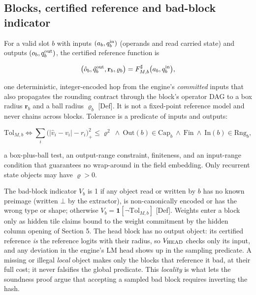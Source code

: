 \documentclass[10pt]{article}
\begin{document}
\subsection{Blocks, certified reference and bad-block indicator}
For a valid slot $b$ with inputs $(a_b,q^{\rm in}_b)$ (operands and read carried state) and outputs $(o_b,q^{\rm out}_b)$, the certified reference function is

\[\big(\hat o_b,\hat q^{\rm out}_b,\mathbf r_b,\varrho_b\big)=F^\sharp_{M,b}\big(a_b,q^{\rm in}_b\big),\]

one deterministic, integer-encoded hop from the engine's \emph{committed} inputs that also propagates the rounding contract through the block's operator DAG to a box radius $\mathbf r_b$ and a ball radius $\varrho_b$ [Def]. It is not a fixed-point reference model and never chains across blocks. Tolerance is a predicate of inputs and outputs:

\[\mathrm{Tol}_{M,b}\iff \sum_i\big(|\hat v_i-v_i|-r_i\big)_+^2\le\varrho^2\ \wedge\ \mathrm{Out}(b)\in\mathrm{Cap}_b\ \wedge\ \mathrm{Fin}\ \wedge\ \mathrm{In}(b)\in\mathrm{Rng}_b,\]

a box-plus-ball test, an output-range constraint, finiteness, and an input-range condition that guarantees no wrap-around in the field embedding. Only recurrent state objects may have $\varrho>0$.

The bad-block indicator $V_b$ is 1 if any object read or written by $b$ has no known preimage (written $\bot$ by the extractor), is non-canonically encoded or has the wrong type or shape; otherwise $V_b=\mathbf 1[\neg\mathrm{Tol}_{M,b}]$ [Def]. Weights enter a block only as hidden tile claims bound to the weight commitment by the hidden column opening of Section 5. The head block has no output object: its certified reference \emph{is} the reference logits with their radius, so $V_{\rm HEAD}$ checks only its input, and any deviation in the engine's LM head shows up in the sampling predicate. A missing or illegal \emph{local} object makes only the blocks that reference it bad, at their full cost; it never falsifies the global predicate. This \emph{locality} is what lets the soundness proof argue that accepting a sampled bad block requires inverting the hash.
\end{document}
